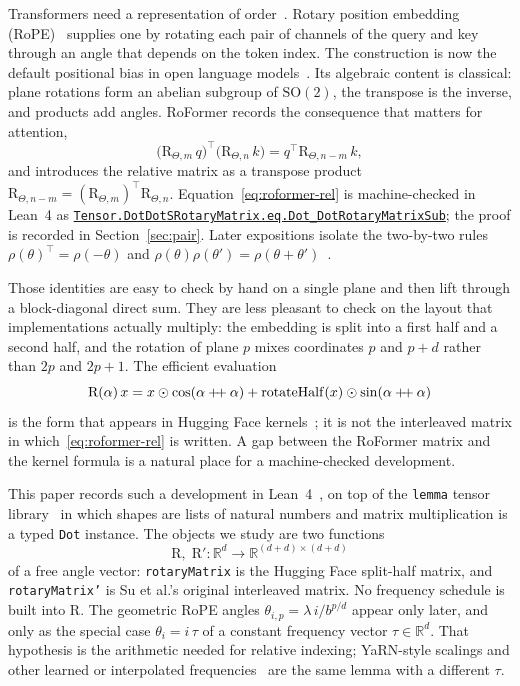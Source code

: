 \documentclass[11pt,a4paper]{article}
\newcommand{\lmod}[1]{\href{http://www.lemma.cn/lean/?module=#1}{\nolinkurl{#1}}}
\newcommand{\R}{\mathbb{R}}
\newcommand{\rot}{\mathrm{R}}
\newcommand{\concat}{\mathbin{+\mkern-4mu+}}
\begin{document}
Transformers need a representation of order~\cite{vaswani2017attention}.
Rotary position embedding (RoPE)~\cite{su2021roformer,su2024roformer} supplies one by rotating each pair of channels of the query and key through an angle that depends on the token index.
The construction is now the default positional bias in open language models~\cite{touvron2023llama}.
Its algebraic content is classical: plane rotations form an abelian subgroup of \(\mathrm{SO}(2)\), the transpose is the inverse, and products add angles.
RoFormer records the consequence that matters for attention,
\begin{equation}
  \label{eq:roformer-rel}
  \bigl(\rot_{\Theta,m}\,q\bigr)^\top\bigl(\rot_{\Theta,n}\,k\bigr)
  = q^\top \rot_{\Theta,n-m}\,k,
\end{equation}
and introduces the relative matrix as a transpose product
\(\rot_{\Theta,n-m}=(\rot_{\Theta,m})^\top\rot_{\Theta,n}\).
Equation~\eqref{eq:roformer-rel} is machine-checked in Lean~4 as
\lmod{Tensor.DotDotSRotaryMatrix.eq.Dot_DotRotaryMatrixSub};
the proof is recorded in Section~\ref{sec:pair}.
Later expositions isolate the two-by-two rules \(\rho(\theta)^\top=\rho(-\theta)\) and \(\rho(\theta)\rho(\theta')=\rho(\theta+\theta')\)~\cite{barbero2025round}.

Those identities are easy to check by hand on a single plane and then lift through a block-diagonal direct sum.
They are less pleasant to check on the layout that implementations actually multiply: the embedding is split into a first half and a second half, and the rotation of plane \(p\) mixes coordinates \(p\) and \(p+d\) rather than \(2p\) and \(2p+1\).
The efficient evaluation
\begin{equation}
  \label{eq:impl-intro}
  \rot(\alpha)\,x
  = x \odot \cos(\alpha\concat\alpha)
  + \mathrm{rotateHalf}(x)\odot\sin(\alpha\concat\alpha)
\end{equation}
is the form that appears in Hugging Face kernels~\cite{huggingface_rope_utils,touvron2023llama}; it is not the interleaved matrix in which~\eqref{eq:roformer-rel} is written.
A gap between the RoFormer matrix and the kernel formula is a natural place for a machine-checked development.

This paper records such a development in Lean~4~\cite{moura2021lean4}, on top of the \texttt{lemma} tensor library~\cite{lemma_repo} in which shapes are lists of natural numbers and matrix multiplication is a typed \texttt{Dot} instance.
The objects we study are two functions
\[
  \rot,\;\rot' : \R^d \to \R^{(d+d)\times(d+d)}
\]
of a free angle vector:
\texttt{rotaryMatrix} is the Hugging Face split-half matrix, and
\texttt{rotaryMatrix'} is Su et al.'s original interleaved matrix.
No frequency schedule is built into \(\rot\).
The geometric RoPE angles \(\theta_{i,p}=\lambda\,i/b^{p/d}\) appear only later, and only as the special case \(\theta_i=i\,\tau\) of a constant frequency vector \(\tau\in\R^d\).
That hypothesis is the arithmetic needed for relative indexing; YaRN-style scalings and other learned or interpolated frequencies~\cite{peng2023yarn} are the same lemma with a different \(\tau\).
\end{document}
